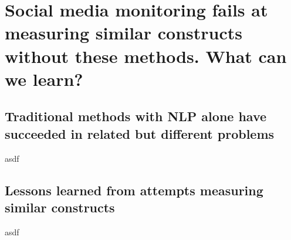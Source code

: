\chapter{Social media monitoring fails at measuring similar constructs without these methods. What can we learn?}\label{chap:prevmethods}

\section{Traditional methods with NLP alone have succeeded in related but different problems}
asdf
\section{Lessons learned from attempts measuring similar constructs}
asdf

